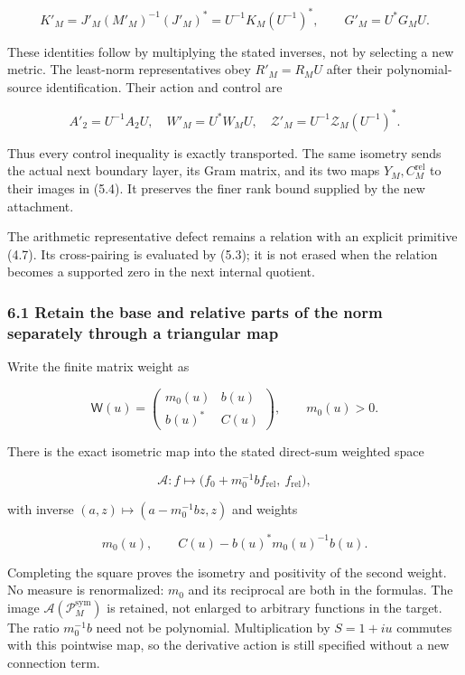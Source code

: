 \documentclass[
]{article}
\begin{document}
\[K'_M=J'_M(M'_M)^{-1}(J'_M)^*=U^{-1}K_M(U^{-1})^*,\qquad
G'_M=U^*G_MU.\tag{6.2}\]

These identities follow by multiplying the stated inverses, not by
selecting a new metric. The least-norm representatives obey
\(R'_M=R_MU\) after their polynomial-source identification. Their action
and control are

\[A'_2=U^{-1}A_2U,\quad W'_M=U^*W_MU,\quad
\mathcal Z'_M=U^{-1}\mathcal Z_M(U^{-1})^*.\tag{6.3}\]

Thus every control inequality is exactly transported. The same isometry
sends the actual next boundary layer, its Gram matrix, and its two maps
\(Y_M,C_M^{\mathrm{rel}}\) to their images in (5.4). It preserves the
finer rank bound supplied by the new attachment.

The arithmetic representative defect remains a relation with an explicit
primitive (4.7). Its cross-pairing is evaluated by (5.3); it is not
erased when the relation becomes a supported zero in the next internal
quotient.

\subsubsection{6.1 Retain the base and relative parts of the norm
separately through a triangular
map}\label{retain-the-base-and-relative-parts-of-the-norm-separately-through-a-triangular-map}

Write the finite matrix weight as

\[\mathsf W(u)=\begin{pmatrix}m_0(u)&b(u)\\b(u)^*&C(u)\end{pmatrix},\qquad m_0(u)>0.\]

There is the exact isometric map into the stated direct-sum weighted
space

\[\mathcal A:f\longmapsto\bigl(f_0+m_0^{-1}b f_{\mathrm{rel}},\ f_{\mathrm{rel}}\bigr),\tag{6.4}\]

with inverse \((a,z)\mapsto(a-m_0^{-1}bz,z)\) and weights

\[m_0(u),\qquad C(u)-b(u)^*m_0(u)^{-1}b(u).\tag{6.5}\]

Completing the square proves the isometry and positivity of the second
weight. No measure is renormalized: \(m_0\) and its reciprocal are both
in the formulas. The image \(\mathcal A(\mathcal P_M^{\mathrm{sym}})\)
is retained, not enlarged to arbitrary functions in the target. The
ratio \(m_0^{-1}b\) need not be polynomial. Multiplication by \(S=1+iu\)
commutes with this pointwise map, so the derivative action is still
specified without a new connection term.
\end{document}
